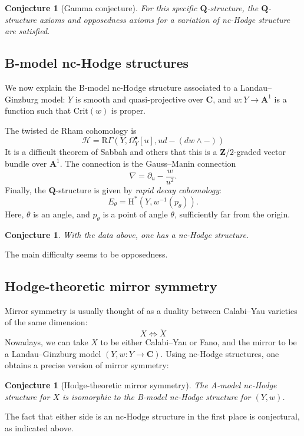 \documentclass[11pt, reqno]{amsart}
\numberwithin{equation}{section}
\theoremstyle{plain}
\newtheorem{conjecture}[theorem]{Conjecture}
\theoremstyle{definition}
\theoremstyle{italicsname}
\newcommand{\cH}{\mathcal{H}}
\newcommand{\rH}{\mathrm{H}}
\newcommand{\rR}{\mathrm{R}}
\newcommand{\bA}{\mathbf{A}}
\newcommand{\bC}{\mathbf{C}}
\newcommand{\bZ}{\mathbf{Z}}
\newcommand{\bQ}{\mathbf{Q}}
\newcommand{\Crit}{\mathrm{Crit}}
\begin{document}
\begin{conjecture}[Gamma conjecture]
    For this specific $\bQ$-structure, the $\bQ$-structure axioms and opposedness axioms for a variation of nc-Hodge structure are satisfied.
\end{conjecture}

\subsection*{B-model nc-Hodge structures}

We now explain the B-model nc-Hodge structure associated to a Landau--Ginzburg model: $Y$ is smooth and quasi-projective over $\bC$, and $w:Y \to \bA^1$ is a function such that $\Crit(w)$ is proper. 

The twisted de Rham cohomology is 
\[
    \cH = \rR \Gamma(Y, \Omega_Y^\bullet[u], ud - (dw \wedge-))
\]
It is a difficult theorem of Sabbah and others that this is a $\bZ/2$-graded vector bundle over $\bA^1$. The connection is the Gauss--Manin connection
\[
    \nabla = \partial_u - \frac{w}{u^2}.
\]
Finally, the $\bQ$-structure is given by \emph{rapid decay cohomology}: 
\[
    E_{\theta} = \rH^*(Y, w^{-1}(p_{\theta})).
\]
Here, $\theta$ is an angle, and $p_{\theta}$ is a point of angle $\theta$, sufficiently far from the origin. 

\begin{conjecture}
    With the data above, one has a nc-Hodge structure. 
\end{conjecture}

The main difficulty seems to be opposedness.

\subsection*{Hodge-theoretic mirror symmetry}
Mirror symmetry is usually thought of as a duality between Calabi--Yau varieties of the same dimension:
\[
    X \iff \check X
\]
Nowadays, we can take $X$ to be either Calabi--Yau or Fano, and the mirror to be a Landau--Ginzburg model $(Y, w:Y \to \bC)$.
Using nc-Hodge structures, one obtains a precise version of mirror symmetry:

\begin{conjecture}[Hodge-theoretic mirror symmetry]
    The A-model nc-Hodge structure for $X$ is isomorphic to the B-model nc-Hodge structure for $(Y, w)$.
\end{conjecture}

The fact that either side is an nc-Hodge structure in the first place is conjectural, as indicated above.
\end{document}
